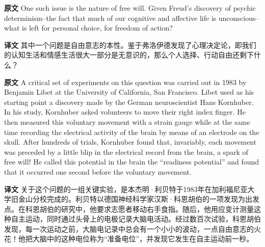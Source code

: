 \documentclass[UTF8,zihao=-4]{ctexart}
\newcommand{\BodyFont}{\fontsize{10.5pt}{15.5pt}\selectfont}
\newcommand{\origlabel}{\textbf{原文}\quad}
\newcommand{\translabel}{\textbf{译文}\quad}
\newenvironment{enblock}{\par\noindent\begingroup\BodyFont\origlabel}{\par\endgroup}
\newenvironment{zhblock}{\par\noindent\begingroup\BodyFont\translabel}{\par\endgroup\vspace{0.35em}}
\begin{document}
\begin{enblock}
One such issue is the nature of free will. Given Freud's discovery of psychic determinism--the fact that much of our cognitive and affective life is unconscious--what is left for personal choice, for freedom of action?
\end{enblock}
\begin{zhblock}
其中一个问题是自由意志的本性。鉴于弗洛伊德发现了心理决定论，即我们的认知生活和情感生活很大一部分是无意识的，那么个人选择、行动自由还剩下什么？
\end{zhblock}

\begin{enblock}
A critical set of experiments on this question was carried out in 1983 by Benjamin Libet at the University of California, San Francisco. Libet used as his starting point a discovery made by the German neuroscientist Hans Kornhuber. In his study, Kornhuber asked volunteers to move their right index finger. He then measured this voluntary movement with a strain gauge while at the same time recording the electrical activity of the brain by means of an electrode on the skull. After hundreds of trials, Kornhuber found that, invariably, each movement was preceded by a little blip in the electrical record from the brain, a spark of free will! He called this potential in the brain the “readiness potential” and found that it occurred one second before the voluntary movement.
\end{enblock}
\begin{zhblock}
关于这个问题的一组关键实验，是本杰明·利贝特于1983年在加利福尼亚大学旧金山分校完成的。利贝特以德国神经科学家汉斯·科恩胡伯的一项发现为出发点。在科恩胡伯的研究中，他要求志愿者移动右手食指。随后，他用应变计测量这种自主运动，同时通过头骨上的电极记录大脑电活动。经过数百次试验，科恩胡伯发现，每一次运动之前，大脑电记录中总会有一个小小的波动，一点自由意志的火花！他把大脑中的这种电位称为“准备电位”，并发现它发生在自主运动前一秒。\end{zhblock}
\end{document}

